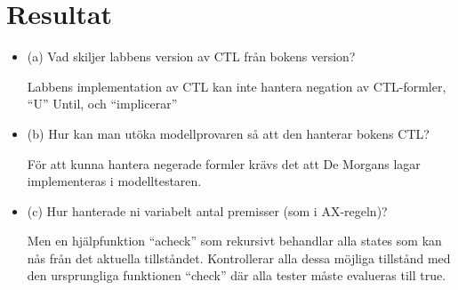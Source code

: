 \section{Resultat}
\begin{itemize}
\item (a) Vad skiljer labbens version av CTL från bokens version?

Labbens implementation av CTL kan inte hantera negation av CTL-formler, “U” Until, och
“implicerar”

\item (b) Hur kan man utöka modellprovaren så att den hanterar bokens CTL?

För att kunna hantera negerade formler krävs det att De Morgans lagar implementeras i
modelltestaren. 

\item (c) Hur hanterade ni variabelt antal premisser (som i AX-regeln)?

Men en hjälpfunktion “acheck” som rekursivt behandlar alla states som kan nås från det aktuella tillståndet. Kontrollerar alla dessa möjliga tillstånd med den ursprungliga funktionen “check” där alla tester måste evalueras till true.

\end{itemize}